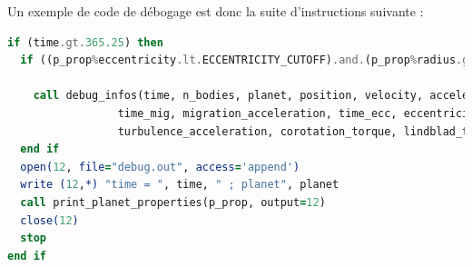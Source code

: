 Un exemple de code de débogage est donc la suite d'instructions suivante :
\begin{lstlisting}[language=Fortran]
if (time.gt.365.25) then
  if ((p_prop%eccentricity.lt.ECCENTRICITY_CUTOFF).and.(p_prop%radius.gt.INNER_BOUNDARY_RADIUS)) then
  
    call debug_infos(time, n_bodies, planet, position, velocity, acceleration, &
                 time_mig, migration_acceleration, time_ecc, eccentricity_acceleration, &
                 turbulence_acceleration, corotation_torque, lindblad_torque, torque_ref, ecc_corot)
  end if
  open(12, file="debug.out", access='append')
  write (12,*) "time = ", time, " ; planet", planet
  call print_planet_properties(p_prop, output=12)
  close(12)
  stop
end if
\end{lstlisting}
